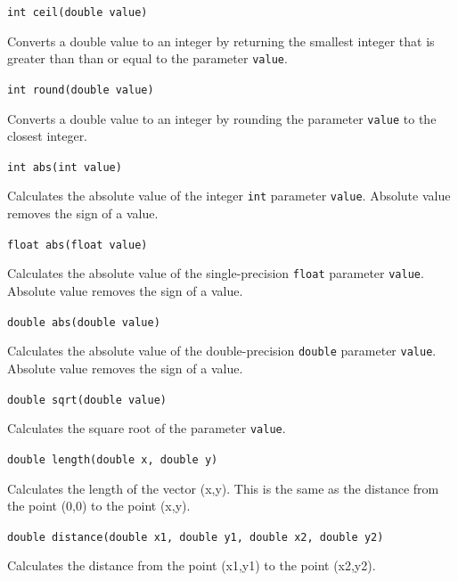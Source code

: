 \documentclass[a4paper, 10pt]{report}
\begin{document}
\hrulefill

{\large {\tt int ceil(double value)}}

Converts a double value to an integer by returning the smallest integer that is greater than than or equal to the parameter {\tt value}.

\hrulefill

{\large {\tt int round(double value)}}

Converts a double value to an integer by rounding the parameter {\tt value} to the closest integer.

\hrulefill

{\large {\tt int abs(int value)}}

Calculates the absolute value of the integer {\tt int} parameter {\tt value}. Absolute value removes the sign of a value.

\hrulefill

{\large {\tt float abs(float value)}}

Calculates the absolute value of the single-precision {\tt float} parameter {\tt value}. Absolute value removes the sign of a value.

\hrulefill

{\large {\tt double abs(double value)}}

Calculates the absolute value of the double-precision {\tt double} parameter {\tt value}. Absolute value removes the sign of a value.

\hrulefill

{\large {\tt double sqrt(double value)}}

Calculates the square root of the parameter {\tt value}.

\hrulefill

{\large {\tt double length(double x, double y)}}

Calculates the length of the vector (x,y). This is the same as the distance from the point (0,0) to the point (x,y).

\hrulefill

{\large {\tt double distance(double x1, double y1, double x2, double y2)}}

Calculates the distance from the point (x1,y1) to the point (x2,y2).

\end{document}

